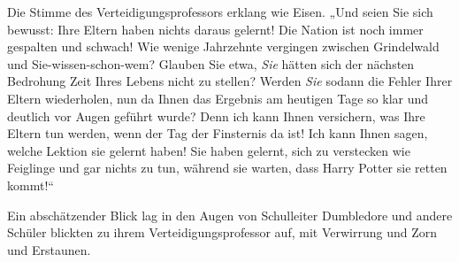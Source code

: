 Die Stimme des Verteidigungsprofessors erklang wie Eisen. „Und seien Sie sich bewusst: Ihre Eltern haben nichts daraus gelernt! Die Nation ist noch immer gespalten und schwach! Wie wenige Jahrzehnte vergingen zwischen Grindelwald und Sie-wissen-schon-wem? Glauben Sie etwa, \emph{Sie} hätten sich der nächsten Bedrohung Zeit Ihres Lebens nicht zu stellen? Werden \emph{Sie} sodann die Fehler Ihrer Eltern wiederholen, nun da Ihnen das Ergebnis am heutigen Tage so klar und deutlich vor Augen geführt wurde? Denn ich kann Ihnen versichern, was Ihre Eltern tun werden, wenn der Tag der Finsternis da ist! Ich kann Ihnen sagen, welche Lektion sie gelernt haben! Sie haben gelernt, sich zu verstecken wie Feiglinge und gar nichts zu tun, während sie warten, dass Harry Potter sie retten kommt!“

Ein abschätzender Blick lag in den Augen von Schulleiter Dumbledore und andere Schüler blickten zu ihrem Verteidigungsprofessor auf, mit Verwirrung und Zorn und Erstaunen.

